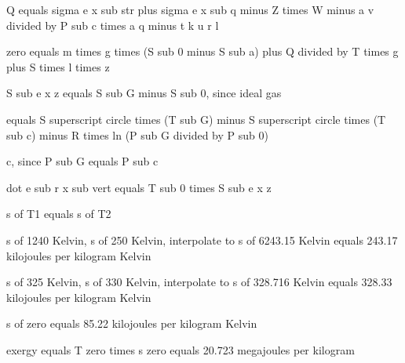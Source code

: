 Q equals sigma e x sub str plus sigma e x sub q minus Z times W minus a v divided by P sub c times a q minus t k u r l

zero equals m times g times (S sub 0 minus S sub a) plus Q divided by T times g plus S times l times z

S sub e x z equals S sub G minus S sub 0, since ideal gas

equals S superscript circle times (T sub G) minus S superscript circle times (T sub c) minus R times ln (P sub G divided by P sub 0)

c, since P sub G equals P sub c

dot e sub r x sub vert equals T sub 0 times S sub e x z

s of T1 equals s of T2

s of 1240 Kelvin, s of 250 Kelvin, interpolate to s of 6243.15 Kelvin equals 243.17 kilojoules per kilogram Kelvin

s of 325 Kelvin, s of 330 Kelvin, interpolate to s of 328.716 Kelvin equals 328.33 kilojoules per kilogram Kelvin

s of zero equals 85.22 kilojoules per kilogram Kelvin

exergy equals T zero times s zero equals 20.723 megajoules per kilogram